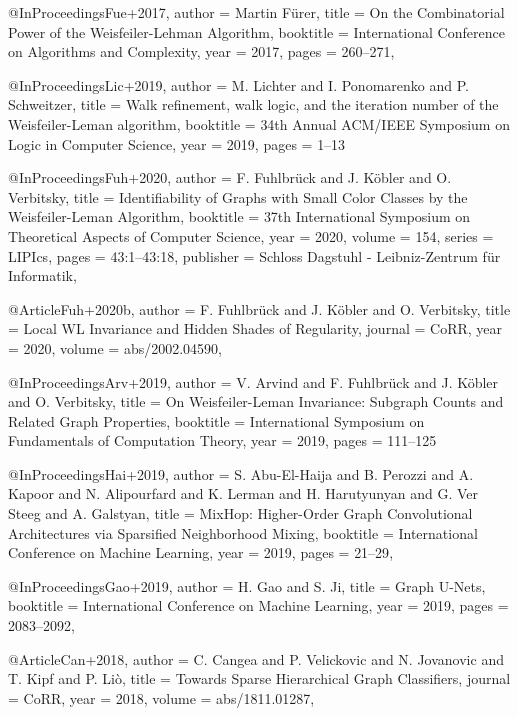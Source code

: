 @InProceedings{Fue+2017,
  author    = {Martin F{\"{u}}rer},
  title     = {On the Combinatorial Power of the {Weisfeiler-Lehman} Algorithm},
  booktitle = {International Conference on Algorithms and Complexity},
  year      = {2017},
  pages     = {260--271},
}

@InProceedings{Lic+2019,
  author    = {M. Lichter and I. Ponomarenko and P. Schweitzer},
  title     = {Walk refinement, walk logic, and the iteration number of the {Weisfeiler-Leman} algorithm},
  booktitle = {34th Annual {ACM/IEEE} Symposium on Logic in Computer Science},
  year      = {2019},
  pages     = {1--13}
}

@InProceedings{Fuh+2020,
  author    = {F. Fuhlbr{\"{u}}ck and J. K{\"{o}}bler and O. Verbitsky},
  title     = {Identifiability of Graphs with Small Color Classes by the {Weisfeiler-Leman} Algorithm},
  booktitle = {37th International Symposium on Theoretical Aspects of Computer Science},
  year      = {2020},
  volume    = {154},
  series    = {LIPIcs},
  pages     = {43:1--43:18},
  publisher = {Schloss Dagstuhl - Leibniz-Zentrum f{\"{u}}r Informatik},
}

@Article{Fuh+2020b,
  author  = {F. Fuhlbr{\"{u}}ck and J. K{\"{o}}bler and O. Verbitsky},
  title   = {Local {WL} Invariance and Hidden Shades of Regularity},
  journal = {CoRR},
  year    = {2020},
  volume  = {abs/2002.04590},
}

@InProceedings{Arv+2019,
  author    = {V. Arvind and F. Fuhlbr{\"{u}}ck and J. K{\"{o}}bler and O. Verbitsky},
  title     = {On {Weisfeiler-Leman} Invariance: Subgraph Counts and Related Graph Properties},
  booktitle = {International Symposium on Fundamentals of Computation Theory},
  year      = {2019},
  pages     = {111--125}
}

@InProceedings{Hai+2019,
  author    = {S. Abu{-}El{-}Haija and B. Perozzi and A. Kapoor and N. Alipourfard and K. Lerman and H. Harutyunyan and G. Ver Steeg and A. Galstyan},
  title     = {MixHop: Higher-Order Graph Convolutional Architectures via Sparsified Neighborhood Mixing},
  booktitle = {International Conference on Machine Learning},
  year      = {2019},
  pages     = {21--29},
}

@InProceedings{Gao+2019,
  author    = {H. Gao and S. Ji},
  title     = {{Graph U-Nets}},
  booktitle = {International Conference on Machine Learning},
  year      = {2019},
  pages     = {2083--2092},
}

@Article{Can+2018,
  author  = {C. Cangea and P. Velickovic and N. Jovanovic and T. Kipf and P. Li{\`{o}}},
  title   = {Towards Sparse Hierarchical Graph Classifiers},
  journal = {CoRR},
  year    = {2018},
  volume  = {abs/1811.01287},
}

